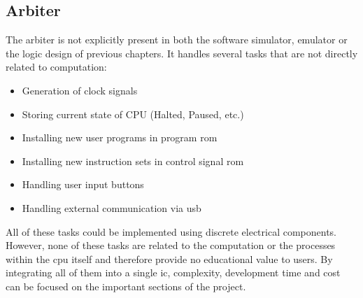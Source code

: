 \subsection{Arbiter} \label{sec:hardware_arbiter}

The arbiter is not explicitly present in both the software simulator, emulator or the logic design of previous chapters. It handles several tasks that are not directly related to computation:

\begin{itemize}
    \item Generation of clock signals
    \item Storing current state of CPU (Halted, Paused, etc.)
    \item Installing new user programs in program \ac{rom}
    \item Installing new instruction sets in control signal \ac{rom}
    \item Handling user input buttons
    \item Handling external communication via \ac{usb}
\end{itemize}

All of these tasks could be implemented using discrete electrical components. However, none of these tasks are related to the computation or the processes within the \ac{cpu} itself and therefore provide no educational value to users. By integrating all of them into a single \ac{ic}, complexity, development time and cost can be focused on the important sections of the project.


